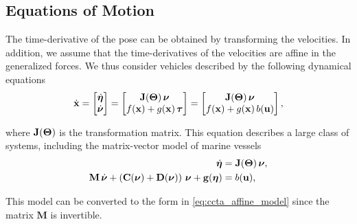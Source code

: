 \subsection{Equations of Motion}

The time-derivative of the pose can be obtained by transforming the velocities. %
In addition, we assume that the time-derivatives of the velocities are affine in the generalized forces.
We thus consider vehicles described by the following dynamical equations
\begin{equation}
    \dot{\mathbf{x}} = \begin{bmatrix} \dot{\bm{\eta}} \\ \dot{\bm{\nu}} \end{bmatrix} = \begin{bmatrix}
        \mathbf{J}(\bm{\Theta})\,\bm{\nu} \\ f(\mathbf{x}) + g(\mathbf{x})\,\bm{\tau}
    \end{bmatrix} = \begin{bmatrix}
        \mathbf{J}(\bm{\Theta})\,\bm{\nu} \\ f(\mathbf{x}) + g(\mathbf{x})\,b(\mathbf{u})
    \end{bmatrix},
    \label{eq:ccta_affine_model}
\end{equation}

\noindent where $\mathbf{J}(\bm{\Theta})$ is the transformation matrix. %
This equation describes a large class of systems, including the matrix-vector model of marine vessels \cite{fossen_handbook_2011}
\begin{subequations}
    \begin{align}
        \dot{\pose} &= \mathbf{J}(\bs{\Theta})\,\vel, \\
        \mathbf{M}\,\dot{\vel} + \left(\mathbf{C}(\vel) + \mathbf{D}(\vel)\right)\,\vel + \mathbf{g}(\pose) &= b(\mathbf{u}),%
    \end{align}
    \label{eq:ccta_matrix_model}
    \vspace{-4mm}
\end{subequations}

\noindent This model can be converted to the form in \eqref{eq:ccta_affine_model} since the matrix $\mathbf{M}$ is invertible.

